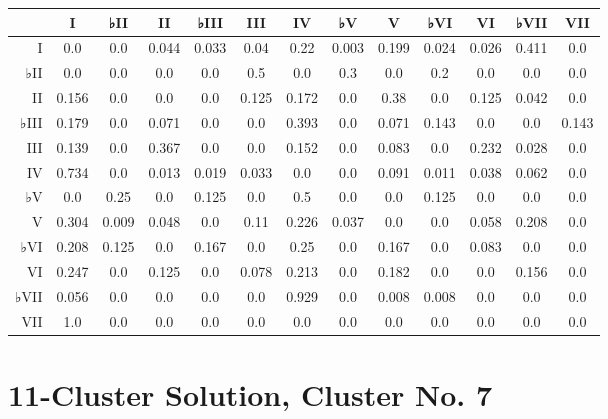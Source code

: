 \begin{table}[htbp]
\begin{minipage}{\linewidth}
\setlength{\tymax}{0.5\linewidth}
\centering
\small
\begin{tabulary}{\textwidth}{@{}RCCCCCCCCCCCC@{}} \toprule
&I&♭II&II&♭III&III&IV&♭V&V&♭VI&VI&♭VII&VII\\
\midrule
I&0.0&0.0&0.044&0.033&0.04&0.22&0.003&0.199&0.024&0.026&0.411&0.0\\
♭II&0.0&0.0&0.0&0.0&0.5&0.0&0.3&0.0&0.2&0.0&0.0&0.0\\
II&0.156&0.0&0.0&0.0&0.125&0.172&0.0&0.38&0.0&0.125&0.042&0.0\\
♭III&0.179&0.0&0.071&0.0&0.0&0.393&0.0&0.071&0.143&0.0&0.0&0.143\\
III&0.139&0.0&0.367&0.0&0.0&0.152&0.0&0.083&0.0&0.232&0.028&0.0\\
IV&0.734&0.0&0.013&0.019&0.033&0.0&0.0&0.091&0.011&0.038&0.062&0.0\\
♭V&0.0&0.25&0.0&0.125&0.0&0.5&0.0&0.0&0.125&0.0&0.0&0.0\\
V&0.304&0.009&0.048&0.0&0.11&0.226&0.037&0.0&0.0&0.058&0.208&0.0\\
♭VI&0.208&0.125&0.0&0.167&0.0&0.25&0.0&0.167&0.0&0.083&0.0&0.0\\
VI&0.247&0.0&0.125&0.0&0.078&0.213&0.0&0.182&0.0&0.0&0.156&0.0\\
♭VII&0.056&0.0&0.0&0.0&0.0&0.929&0.0&0.008&0.008&0.0&0.0&0.0\\
VII&1.0&0.0&0.0&0.0&0.0&0.0&0.0&0.0&0.0&0.0&0.0&0.0\\

\bottomrule

\end{tabulary}
\end{minipage}
\end{table}

\section{11-Cluster Solution, Cluster No. 7}
\label{11-clustersolutionclusterno.7}


